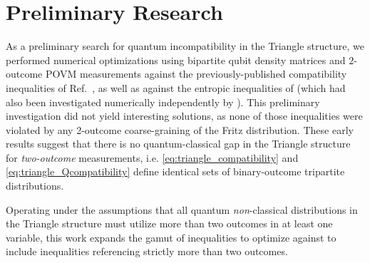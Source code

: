 \documentclass[aps, 10pt, english, twoside, pra, nofootinbib, tightenlines, longbibliography, superscriptaddress]{revtex4-1}
\begin{document}
    \section{Preliminary Research}
    \label{sec:preliminary_research}

    As a preliminary search for quantum incompatibility in the Triangle structure, we performed numerical optimizations using bipartite qubit density matrices and $2$-outcome POVM measurements against the previously-published compatibility inequalities of Ref.~\cite{Inflation}, as well as against the entropic inequalities of \citet{Henson_2014} (which had also been investigated numerically independently by \citet{Weilenmann_2016}). This preliminary investigation did not yield interesting solutions, as none of those inequalities were violated by any 2-outcome coarse-graining of the Fritz distribution. These early results suggest that there is no quantum-classical gap in the Triangle structure for \textit{two-outcome} measurements, i.e. \cref{eq:triangle_compatibility} and \cref{eq:triangle_Qcompatibility} define identical sets of binary-outcome tripartite distributions.

    Operating under the assumptions that all quantum \emph{non}-classical distributions in the Triangle structure must utilize more than two outcomes in at least one variable, this work expands the gamut of inequalities to optimize against to include inequalities referencing strictly more than two outcomes.


\end{document}
